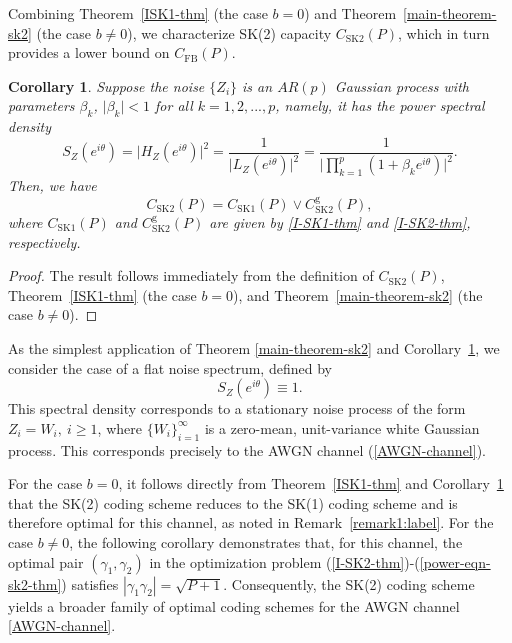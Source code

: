 \documentclass[12pt]{article}
\newtheorem{co}[thm]{Corollary}
\begin{document}
Combining Theorem~\ref{ISK1-thm} (the case $b=0$) and Theorem~\ref{main-theorem-sk2} (the case $b\neq0$), we characterize SK(2) capacity $C_\mathrm{SK2}(P)$, which in turn provides a lower bound on $C_\mathrm{FB}(P)$.
\begin{co}\label{main-col-sk2:label}
Suppose the noise $\{ Z_i \}$ is an $AR(p)$ Gaussian process with parameters $\beta_k$, $\vert \beta_k\vert<1$ for all $k=1,2,...,p$, namely, it has the power spectral density
\begin{equation*}
S_Z(e^{i\theta}) = \vert H_Z(e^{i\theta}) \vert^2 = \frac{1}{\vert L_Z(e^{i\theta}) \vert^2} = \frac{1}{\vert\prod_{k=1}^{p}(1+\beta_ke^{i\theta})\vert^2}.
\end{equation*}
Then, we have
\begin{equation*}
C_\mathrm{SK2}(P)=  C_\mathrm{SK1}(P)\vee C^\mathrm{g}_\mathrm{SK2}(P),
\end{equation*}
where $C_\mathrm{SK1}(P)$ and $C^\mathrm{g}_\mathrm{SK2}(P)$ are given by \eqref{I-SK1-thm} and \eqref{I-SK2-thm}, respectively.
\end{co}
\begin{proof}
The result follows immediately from the definition of $C_\mathrm{SK2}(P)$, Theorem~\ref{ISK1-thm} (the case $b=0$), and Theorem~\ref{main-theorem-sk2} (the case $b\neq0$).
\end{proof}
As the simplest application of Theorem \ref{main-theorem-sk2} and Corollary~\ref{main-col-sk2:label}, we consider the case of a flat noise spectrum, defined by 
\begin{equation}\label{AWGN-SDF}
   S_Z(e^{i\theta})\equiv 1.
\end{equation}
This spectral density corresponds to a stationary noise process of the form $Z_i = W_i,~i\ge 1$, where $\{W_i\}_{i=1}^{\infty}$ is a zero-mean, unit-variance white Gaussian process. This corresponds precisely to the AWGN channel (\ref{AWGN-channel}). 

For the case $b = 0$, it follows directly from Theorem~\ref{ISK1-thm} and Corollary~\ref{main-col-sk2:label} that the SK(2) coding scheme reduces to the SK(1) coding scheme and is therefore optimal for this channel, as noted in Remark~\ref{remark1:label}. For the case $b\neq 0$, the following corollary demonstrates that, for this channel, the optimal pair $(\gamma_1,\gamma_2)$ in the optimization problem (\ref{I-SK2-thm})-(\ref{power-eqn-sk2-thm}) satisfies $|\gamma_1\gamma_2|=\sqrt{P+1}$.  Consequently, the SK(2) coding scheme yields a broader family of optimal coding schemes for the AWGN channel \eqref{AWGN-channel}.
\end{document}
